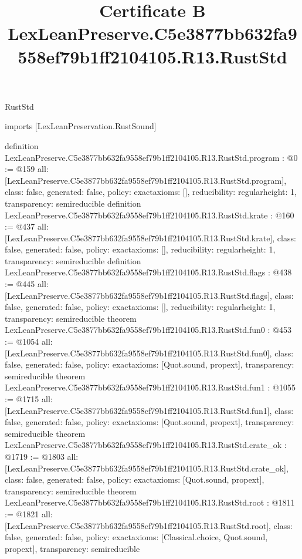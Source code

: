 \begin{lexlean}{RustStd}
\title{Certificate B LexLeanPreserve.C5e3877bb632fa9558ef79b1ff2104105.R13.RustStd}
\begin{coremodule}
imports [LexLeanPreservation.RustSound]

definition LexLeanPreserve.C5e3877bb632fa9558ef79b1ff2104105.R13.RustStd.program : @0 := @159 {
  all: [LexLeanPreserve.C5e3877bb632fa9558ef79b1ff2104105.R13.RustStd.program],
  class: false,
  generated: false,
  policy: exact{axioms: []},
  reducibility: regular{height: 1},
  transparency: semireducible
}
definition LexLeanPreserve.C5e3877bb632fa9558ef79b1ff2104105.R13.RustStd.krate : @160 := @437 {
  all: [LexLeanPreserve.C5e3877bb632fa9558ef79b1ff2104105.R13.RustStd.krate],
  class: false,
  generated: false,
  policy: exact{axioms: []},
  reducibility: regular{height: 1},
  transparency: semireducible
}
definition LexLeanPreserve.C5e3877bb632fa9558ef79b1ff2104105.R13.RustStd.flags : @438 := @445 {
  all: [LexLeanPreserve.C5e3877bb632fa9558ef79b1ff2104105.R13.RustStd.flags],
  class: false,
  generated: false,
  policy: exact{axioms: []},
  reducibility: regular{height: 1},
  transparency: semireducible
}
theorem LexLeanPreserve.C5e3877bb632fa9558ef79b1ff2104105.R13.RustStd.fun0 : @453 := @1054 {
  all: [LexLeanPreserve.C5e3877bb632fa9558ef79b1ff2104105.R13.RustStd.fun0],
  class: false,
  generated: false,
  policy: exact{axioms: [Quot.sound, propext]},
  transparency: semireducible
}
theorem LexLeanPreserve.C5e3877bb632fa9558ef79b1ff2104105.R13.RustStd.fun1 : @1055 := @1715 {
  all: [LexLeanPreserve.C5e3877bb632fa9558ef79b1ff2104105.R13.RustStd.fun1],
  class: false,
  generated: false,
  policy: exact{axioms: [Quot.sound, propext]},
  transparency: semireducible
}
theorem LexLeanPreserve.C5e3877bb632fa9558ef79b1ff2104105.R13.RustStd.crate_ok : @1719 := @1803 {
  all: [LexLeanPreserve.C5e3877bb632fa9558ef79b1ff2104105.R13.RustStd.crate_ok],
  class: false,
  generated: false,
  policy: exact{axioms: [Quot.sound, propext]},
  transparency: semireducible
}
theorem LexLeanPreserve.C5e3877bb632fa9558ef79b1ff2104105.R13.RustStd.root : @1811 := @1821 {
  all: [LexLeanPreserve.C5e3877bb632fa9558ef79b1ff2104105.R13.RustStd.root],
  class: false,
  generated: false,
  policy: exact{axioms: [Classical.choice, Quot.sound, propext]},
  transparency: semireducible
}


\end{coremodule}
\end{lexlean}

